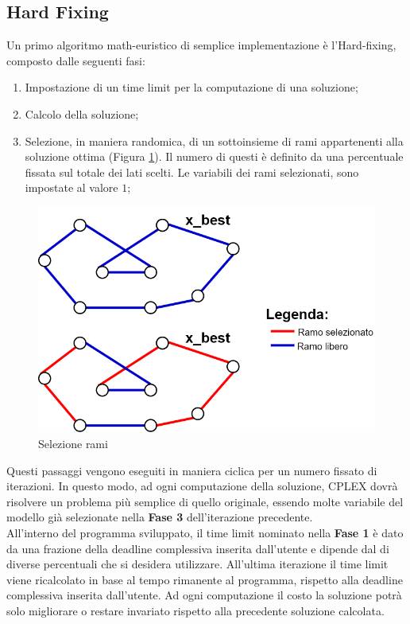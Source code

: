 \subsection{Hard Fixing}\label{hard fixing}
Un primo algoritmo math-euristico di semplice implementazione è l'Hard-fixing, composto dalle seguenti fasi:
\begin{enumerate}
\item{Impostazione di un time limit per la computazione di una soluzione;}
\item{Calcolo della soluzione;}
\item{Selezione, in maniera randomica, di un sottoinsieme di rami appartenenti alla soluzione ottima (Figura \ref{selezione_rami}). 
Il numero di questi è definito da una percentuale fissata sul totale dei lati scelti. Le variabili dei rami selezionati, sono impostate al valore $1$;}
\end{enumerate}
\begin{figure}[h] 
\begin{center} 
  \includegraphics[scale=0.38]{Images/x_best} 
  \caption{\footnotesize{Selezione rami}}
  \label{selezione_rami} 
\end{center} 
\end{figure}
Questi passaggi vengono eseguiti in maniera ciclica per un numero fissato di iterazioni. In questo modo, ad ogni computazione della soluzione, CPLEX dovrà risolvere un problema più semplice di quello originale, essendo molte variabile del modello già selezionate nella \textbf{Fase 3} dell'iterazione precedente.\\
All'interno del programma sviluppato, il time limit nominato nella \textbf{Fase 1} è dato da una frazione della deadline complessiva inserita dall'utente e dipende dal di diverse percentuali che si desidera utilizzare. All'ultima iterazione il time limit viene ricalcolato in base al tempo rimanente al programma, rispetto alla deadline complessiva inserita dall'utente. Ad ogni computazione il costo la soluzione potrà solo migliorare o restare invariato rispetto alla precedente soluzione calcolata.\\
